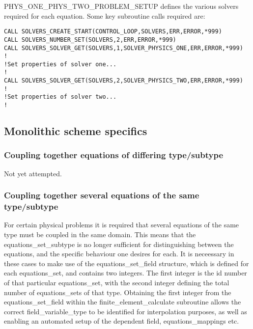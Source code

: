PHYS\_ONE\_PHYS\_TWO\_PROBLEM\_SETUP defines the various solvers required for each equation. Some key subroutine calls required are:

\begin{lstlisting}
CALL SOLVERS_CREATE_START(CONTROL_LOOP,SOLVERS,ERR,ERROR,*999)
CALL SOLVERS_NUMBER_SET(SOLVERS,2,ERR,ERROR,*999)
CALL SOLVERS_SOLVER_GET(SOLVERS,1,SOLVER_PHYSICS_ONE,ERR,ERROR,*999)
!
!Set properties of solver one...
!
CALL SOLVERS_SOLVER_GET(SOLVERS,2,SOLVER_PHYSICS_TWO,ERR,ERROR,*999)
!
!Set properties of solver two...
!
\end{lstlisting}


\subsection{Monolithic scheme specifics}
\label{monolithicspec}

\subsubsection{Coupling together equations of differing type/subtype}

Not yet attempted.

\subsubsection{Coupling together several equations of the same type/subtype}

For certain physical problems it is required that several equations of the same type must be coupled in the same domain. This means that the equations\_set\_subtype is no longer sufficient for distinguishing between the equations, and the specific behaviour one desires for each. It is neceessary in these cases to make use of the equations\_set\_field structure, which is defined for each equations\_set, and contains two integers. The first integer is the id number of that particular equations\_set, with the second integer defining the total number of equations\_sets of that type. Obtaining the first integer from the equations\_set\_field within the finite\_element\_calculate subroutine allows the correct field\_variable\_type to be identified for interpolation purposes, as well as enabling an automated setup of the dependent field, equations\_mappings etc.

